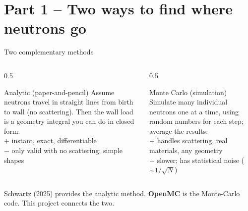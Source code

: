 \documentclass[aspectratio=169]{beamer}
\newcommand{\keyword}[1]{\textcolor{blue!60!black}{\textbf{#1}}}
\begin{document}
\section{Part 1 -- Two ways to find where neutrons go}
\begin{frame}{Two complementary methods}
  \begin{columns}[T]
    \begin{column}{0.5\linewidth}
      \begin{block}{Analytic (paper-and-pencil)}
        \footnotesize Assume neutrons travel in \alert{straight lines} from birth to wall (no scattering). Then the wall load is a \alert{geometry integral} you can do in closed form.\\[4pt]
        $+$ instant, exact, differentiable\\
        $-$ only valid with \alert{no scattering}; simple shapes
      \end{block}
    \end{column}
    \begin{column}{0.5\linewidth}
      \begin{block}{Monte Carlo (simulation)}
        \footnotesize \alert{Simulate many individual neutrons} one at a time, using random numbers for each step; average the results.\\[4pt]
        $+$ handles scattering, real materials, any geometry\\
        $-$ slower; has \alert{statistical noise} ($\sim 1/\sqrt{N}$)
      \end{block}
    \end{column}
  \end{columns}
  \vfill
  \footnotesize Schwartz (2025) provides the \alert{analytic} method. \keyword{OpenMC} is the \alert{Monte-Carlo} code. This project connects the two.
\end{frame}
\end{document}
